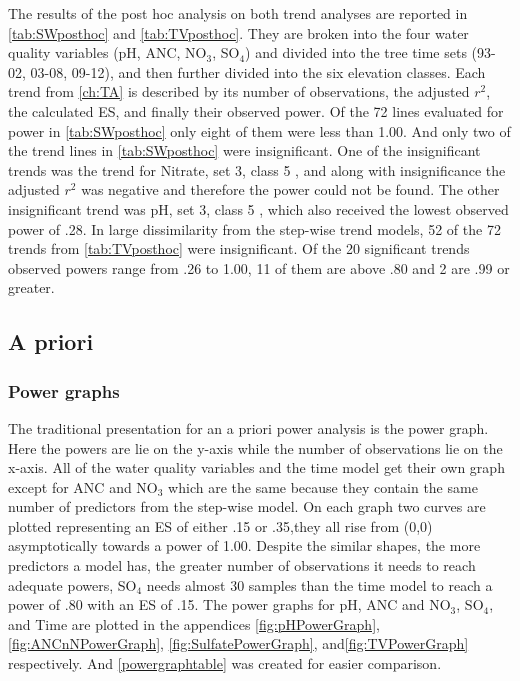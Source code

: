 The results of the post hoc analysis on both trend analyses are reported in  \autoref{tab:SWposthoc} and \autoref{tab:TVposthoc}.
They are broken into the four water quality variables (pH, ANC, NO$_3$, SO$_4$) and divided into the tree time sets (93-02, 03-08, 09-12), and then further divided into the six elevation classes.
Each trend from \autoref{ch:TA} is described by its number of observations, the adjusted $r^2$, the calculated ES, and finally their observed power.
Of the 72 lines evaluated for power in \autoref{tab:SWposthoc} only eight of them were less than 1.00.
And only two of the trend lines in \autoref{tab:SWposthoc} were insignificant.
One of the insignificant trends was the trend for Nitrate, set 3, class 5 , and along with insignificance the adjusted $r^2$ was negative and therefore the power could not be found.
The other insignificant trend was pH, set 3, class 5 , which also received the lowest observed power of .28.
In large dissimilarity from the step-wise trend models, 52 of the 72 trends from \autoref{tab:TVposthoc} were insignificant.
Of the 20 significant trends observed powers range from .26 to 1.00, 11 of them are above .80 and 2 are .99 or greater.

\subsection{A priori}

\subsubsection{Power graphs}

The traditional presentation for an a priori power analysis is the power graph.
Here the powers are lie on the y-axis while the number of observations lie on the x-axis.
All of the water quality variables and the time model get their own graph except for ANC and NO$_3$ which are the same because they contain the same number of predictors from the step-wise model.
On each graph two curves are plotted representing an ES of either .15 or .35,they all rise from (0,0) asymptotically towards a power of 1.00.
Despite the similar shapes, the more predictors a model has, the greater number of  observations it needs to reach adequate powers, SO$_4$ needs almost 30 samples than the time model to reach a power of .80 with an ES of .15.
The power graphs for pH, ANC and NO$_3$, SO$_4$, and Time are plotted in the appendices \autoref{fig:pHPowerGraph}, \autoref{fig:ANCnNPowerGraph}, \autoref{fig:SulfatePowerGraph}, and\autoref{fig:TVPowerGraph} respectively.
And \autoref{powergraphtable} was created for easier comparison.

